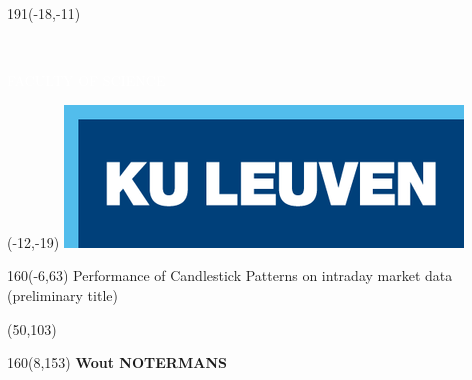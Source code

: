 \thispagestyle{empty}
\newcommand{\form}[1]{\scalebox{1.087}{\boldmath{#1}}}
\sffamily
%
\begin{textblock}{191}(-18,-11)
\colorbox{bluetitle}{\hspace{139mm}\ \parbox[c][18truemm]{52mm}{\textcolor{white}{FACULTY OF SCIENCE}}}
\end{textblock}
%
\begin{textblock}{70}(-12,-19)
\textblockcolour{}
\includegraphics*[height=19.8truemm]{Images/LogoKULeuven}
\end{textblock}
%
\begin{textblock}{160}(-6,63)
\textblockcolour{}
\vspace{-\parskip}
\flushleft
\fontsize{40}{42}\selectfont \textcolor{bluetitle}{Performance of Candlestick Patterns on intraday market data}\\[1.5mm]
\fontsize{20}{22}\selectfont (preliminary title)
\end{textblock}
%
\begin{textblock}{82}(50,103)
\textblockcolour{}
\vspace{-\parskip}
\flushleft
\end{textblock}
%
\begin{textblock}{160}(8,153)
\textblockcolour{}
\vspace{-\parskip}
\flushright
\fontsize{14}{16}\selectfont \textbf{Wout NOTERMANS}
\end{textblock}

